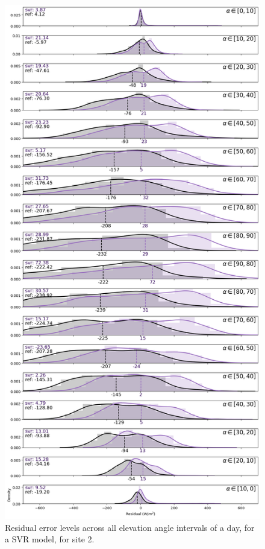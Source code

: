 \begin{figure}[htb!]
    \centering
    \includegraphics[width=\columnwidth]{figures/first_study/residual_errors_svr_site2_mae.png}
\caption{Residual error levels across all elevation angle intervals of a day, for a SVR model, for site 2.}
\end{figure}


